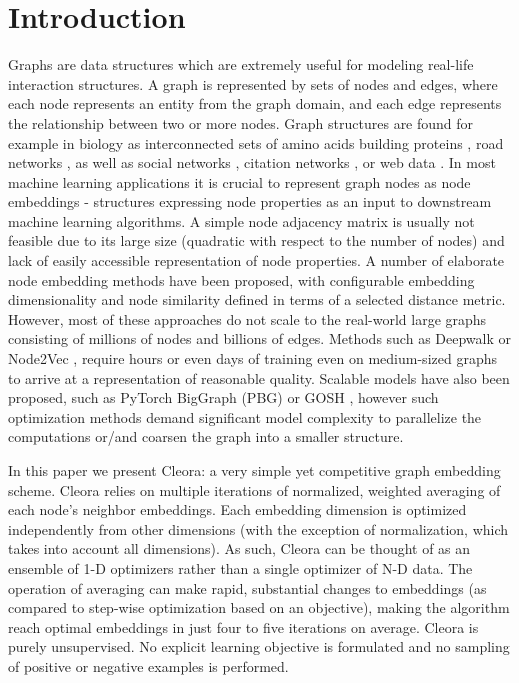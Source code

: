 \documentclass{IEEEtran}
\begin{document}
\section{Introduction}
\label{sec:introduction}
 Graphs are data structures which are extremely useful for modeling real-life interaction structures. A graph is represented by sets of nodes and edges, where each node represents an entity from the graph domain, and each edge represents the relationship between two or more nodes. Graph structures are found for example in biology as interconnected sets of amino acids building proteins  \cite{10.1093/bioinformatics/btz600, yue2020graph, ingraham2019generative, yao2019accurately}, road networks \cite{wu2020learning, zheng2020gman}, as well as social networks \cite{aletras2018predicting, zhang2018cosine}, citation networks \cite{pornprasit2020convcn, asatani2018detecting}, or web data \cite{ristoski2016rdf2vec, cochez2017biased}. In most machine learning applications it is crucial to represent graph nodes as node embeddings - structures expressing node properties as an input to downstream machine learning algorithms. A simple node adjacency matrix is usually not feasible due to its large size (quadratic with respect to the number of nodes) and lack of easily accessible representation of node properties. A number of elaborate node embedding methods have been proposed, with configurable embedding dimensionality and node similarity defined in terms of a selected distance metric. However, most of these approaches do not scale to the real-world large graphs consisting of millions of nodes and billions of edges. Methods such as Deepwalk \cite{perozzi2014deepwalk} or Node2Vec \cite{grover2016node2vec}, require hours or even days of training even on medium-sized graphs to arrive at a representation of reasonable quality. Scalable models have also been proposed, such as PyTorch BigGraph (PBG) \cite{pbg} or GOSH \cite{10.1145/3404397.3404456}, however such optimization methods demand significant model complexity to parallelize the computations or/and coarsen the graph into a smaller structure. 


In this paper we present Cleora: a very simple yet competitive graph embedding scheme. Cleora relies on multiple iterations of normalized, weighted averaging of each node's neighbor embeddings. Each embedding dimension is optimized independently from other dimensions (with the exception of normalization, which takes into account all dimensions). As such, Cleora can be thought of as an ensemble of 1-D optimizers rather than a single optimizer of N-D data. The operation of averaging can make rapid, substantial changes to embeddings (as compared to step-wise optimization based on an objective), making the algorithm reach optimal embeddings in just four to five iterations on average. Cleora is purely unsupervised. No explicit learning objective is formulated and no sampling of positive or negative examples is performed.
\end{document}

